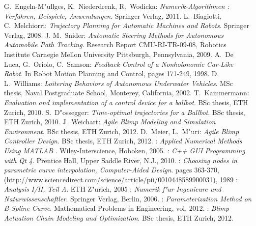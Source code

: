 \begin{thebibliography}{99}



 {\sc G.~Engeln-M"ullges, K.~Niederdrenk, R.~Wodicka}:
{\it Numerik-Algorithmen : Verfahren, Beispiele, Anwendungen}. Springer Verlag, 2011.
 {\sc L.~Biagiotti, C.~Melchiorri}:
{\it Trajectory Planning for Automatic Machines and Robots}. Springer Verlag, 2008.
 {\sc J. M.~Snider}:
{\it Automatic Steering Methods for Autonomous Automobile Path Tracking}. Research Report CMU-RI-TR-09-08, Robotics Institute Carnegie Mellon University Pittsburgh, Pennsylvania, 2009.
 {\sc A.~De Luca, G.~Oriolo, C.~Samson}:
{\it Feedback Control of a Nonholonomic Car-Like Robot}. In Robot Motion Planning and Control, pages 171-249, 1998.
 {\sc D. L.~Williams}:
{\it Loitering Behaviors of Autonomous Underwater Vehicles}. MSc thesis, Naval Postgraduate School, Monterey, California, 2002.
 {\sc T.~Kammermann}:
{\it Evaluation and implementation of a control device for a ballbot}. BSc thesis, ETH Zurich, 2010.
 {\sc S.~D"ossegger}:
{\it Time-optimal trajectories for a Ballbot}. BSc thesis, ETH Zurich, 2010.
 {\sc J.~Weichart}:
{\it Agile Blimp Modeling and Simulation Environment}. BSc thesis, ETH Zurich, 2012.
 {\sc D.~Meier, L.~M"uri}:
{\it Agile Blimp Controller Design}. BSc thesis, ETH Zurich, 2012.
:
{\it Applied Numerical Methods Using MATLAB} . Wiley-Interscience, Hoboken, 2005.
:
{\it C++ GUI Programming with Qt 4}. Prentice Hall, Upper Saddle River, N.J., 2010.
:
{\it Choosing nodes in parametric curve interpolation, Computer-Aided Design}. pages 363-370, (http://www.sciencedirect.com/science/article/pii/0010448589900031), 1989
:
{\it Analysis I/II, Teil A}. ETH Z"urich, 2005
:
{\it Numerik f"ur Ingenieure und Naturwissenschaftler}. Springer Verlag, Berlin, 2006.
:
{\it Parameterization Method on B-Spline Curve}. Mathematical Problems in Engineering, vol. 2012.
:
{\it Blimp Actuation Chain Modeling and Optimization}. BSc thesis, ETH Zurich, 2012.

\end{thebibliography}
